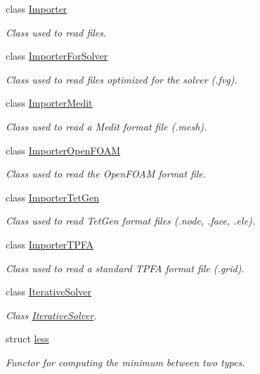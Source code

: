 \begin{DoxyCompactItemize}
class \hyperlink{classFVCode3D_1_1Importer}{Importer}
\begin{DoxyCompactList}\small\item\em Class used to read files. \end{DoxyCompactList}\item 
class \hyperlink{classFVCode3D_1_1ImporterForSolver}{Importer\+For\+Solver}
\begin{DoxyCompactList}\small\item\em Class used to read files optimized for the solver (.fvg). \end{DoxyCompactList}\item 
class \hyperlink{classFVCode3D_1_1ImporterMedit}{Importer\+Medit}
\begin{DoxyCompactList}\small\item\em Class used to read a Medit format file (.mesh). \end{DoxyCompactList}\item 
class \hyperlink{classFVCode3D_1_1ImporterOpenFOAM}{Importer\+Open\+F\+O\+AM}
\begin{DoxyCompactList}\small\item\em Class used to read the Open\+F\+O\+AM format file. \end{DoxyCompactList}\item 
class \hyperlink{classFVCode3D_1_1ImporterTetGen}{Importer\+Tet\+Gen}
\begin{DoxyCompactList}\small\item\em Class used to read Tet\+Gen format files (.node, .face, .ele). \end{DoxyCompactList}\item 
class \hyperlink{classFVCode3D_1_1ImporterTPFA}{Importer\+T\+P\+FA}
\begin{DoxyCompactList}\small\item\em Class used to read a standard T\+P\+FA format file (.grid). \end{DoxyCompactList}\item 
class \hyperlink{classFVCode3D_1_1IterativeSolver}{Iterative\+Solver}
\begin{DoxyCompactList}\small\item\em Class \hyperlink{classFVCode3D_1_1IterativeSolver}{Iterative\+Solver}. \end{DoxyCompactList}\item 
struct \hyperlink{structFVCode3D_1_1less}{less}
\begin{DoxyCompactList}\small\item\em Functor for computing the minimum between two types. \end{DoxyCompactList}\item 

\end{DoxyCompactItemize}

